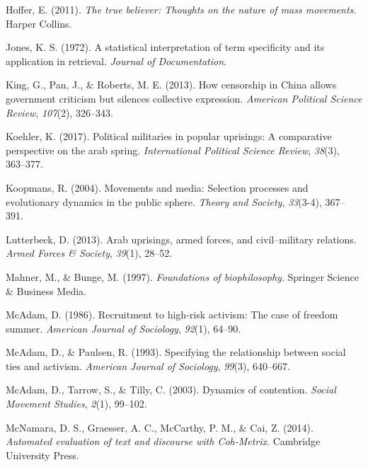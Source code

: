 \documentclass[
  english,
  man]{apa6}
\begin{document}
\leavevmode\hypertarget{ref-Hoffer2011true}{}%
Hoffer, E. (2011). \emph{The true believer: Thoughts on the nature of mass movements}. Harper Collins.

\leavevmode\hypertarget{ref-jones1972statistical}{}%
Jones, K. S. (1972). A statistical interpretation of term specificity and its application in retrieval. \emph{Journal of Documentation}.

\leavevmode\hypertarget{ref-king2013censorship}{}%
King, G., Pan, J., \& Roberts, M. E. (2013). How censorship in China allows government criticism but silences collective expression. \emph{American Political Science Review}, \emph{107}(2), 326--343.

\leavevmode\hypertarget{ref-koehler2017political}{}%
Koehler, K. (2017). Political militaries in popular uprisings: A comparative perspective on the arab spring. \emph{International Political Science Review}, \emph{38}(3), 363--377.

\leavevmode\hypertarget{ref-koopmans2004movements}{}%
Koopmans, R. (2004). Movements and media: Selection processes and evolutionary dynamics in the public sphere. \emph{Theory and Society}, \emph{33}(3-4), 367--391.

\leavevmode\hypertarget{ref-lutterbeck2013arab}{}%
Lutterbeck, D. (2013). Arab uprisings, armed forces, and civil--military relations. \emph{Armed Forces \& Society}, \emph{39}(1), 28--52.

\leavevmode\hypertarget{ref-mahner1997foundations}{}%
Mahner, M., \& Bunge, M. (1997). \emph{Foundations of biophilosophy}. Springer Science \& Business Media.

\leavevmode\hypertarget{ref-mcadam1986recruitment}{}%
McAdam, D. (1986). Recruitment to high-risk activism: The case of freedom summer. \emph{American Journal of Sociology}, \emph{92}(1), 64--90.

\leavevmode\hypertarget{ref-mcadam1993specifying}{}%
McAdam, D., \& Paulsen, R. (1993). Specifying the relationship between social ties and activism. \emph{American Journal of Sociology}, \emph{99}(3), 640--667.

\leavevmode\hypertarget{ref-mcadam2003dynamics}{}%
McAdam, D., Tarrow, S., \& Tilly, C. (2003). Dynamics of contention. \emph{Social Movement Studies}, \emph{2}(1), 99--102.

\leavevmode\hypertarget{ref-mcnamara2014automated}{}%
McNamara, D. S., Graesser, A. C., McCarthy, P. M., \& Cai, Z. (2014). \emph{Automated evaluation of text and discourse with Coh-Metrix}. Cambridge University Press.
\end{document}

